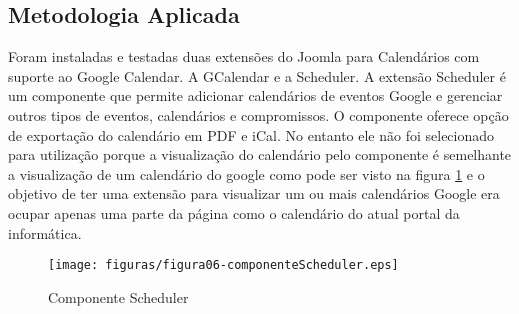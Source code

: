 \subsection{Metodologia Aplicada}
Foram instaladas e testadas duas extensões do Joomla para Calendários com suporte ao Google Calendar. A GCalendar e a Scheduler.
A extensão Scheduler é um componente que permite adicionar calendários de eventos Google e gerenciar outros tipos de eventos, calendários e compromissos. O componente oferece opção de exportação do calendário em PDF e iCal. No entanto ele não foi selecionado para utilização porque a visualização do calendário pelo componente é semelhante a visualização de um calendário do google como pode ser visto na figura \ref{fig:Scheduler} e o objetivo de ter uma extensão para visualizar um ou mais calendários Google era ocupar apenas uma parte da página como o calendário do atual portal da informática.
\begin{figure}[hbtn]
   \centering
   \texttt{[image: figuras/figura06-componenteScheduler.eps]}
   \caption{Componente Scheduler}
   \label{fig:Scheduler}
\end{figure}


